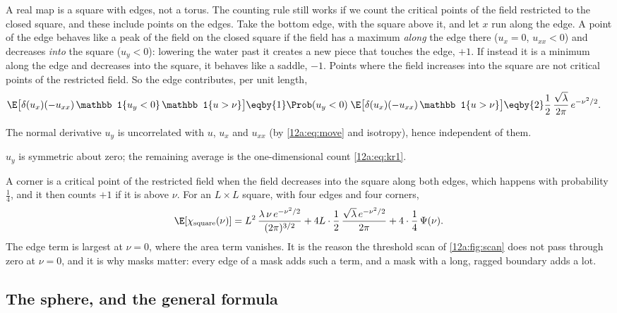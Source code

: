 A real map is a square with edges, not a torus. The counting rule still works if we count the critical
points of the field restricted to the closed square, and these include points on the edges. Take the bottom
edge, with the square above it, and let $x$ run along the edge. A point of the edge behaves like a peak of the
field on the closed square if the field has a maximum \emph{along} the edge there ($u_x=0$, $u_{xx}<0$) and
decreases \emph{into} the square ($u_y<0$): lowering the water past it creates a new piece that touches the
edge, $+1$. If instead it is a minimum along the edge and decreases into the square, it behaves like a saddle,
$-1$. Points where the field increases into the square are not critical points of the restricted field. So
the edge contributes, per unit length,
\begin{align}
  \E\big[\delta(u_x)(-u_{xx})\,\mathbb 1\{u_y<0\}\,\mathbb 1\{u>\nu\}\big]
  &\eqby{1}\Prob(u_y<0)\;\E\big[\delta(u_x)(-u_{xx})\,\mathbb 1\{u>\nu\}\big]
   \eqby{2}\frac12\,\frac{\sqrt\lambda}{2\pi}\,e^{-\nu^2/2}.
  \label{12a:eq:edge}
\end{align}
\begin{explain}
  \item The normal derivative $u_y$ is uncorrelated with $u$, $u_x$ and $u_{xx}$ (by \eqref{12a:eq:move} and
        isotropy), hence independent of them.
  \item $u_y$ is symmetric about zero; the remaining average is the one-dimensional count \eqref{12a:eq:kr1}.
\end{explain}
A corner is a critical point of the restricted field when the field decreases into the square along both
edges, which happens with probability $\frac14$, and it then counts $+1$ if it is above $\nu$. For an
$L\times L$ square, with four edges and four corners,
\begin{equation}
  \E[\chi_{\rm square}(\nu)]=L^2\,\frac{\lambda\,\nu\,e^{-\nu^2/2}}{(2\pi)^{3/2}}
   +4L\cdot\frac12\,\frac{\sqrt\lambda\,e^{-\nu^2/2}}{2\pi}+4\cdot\frac14\,\Psi(\nu) .
  \label{12a:eq:square}
\end{equation}
The edge term is largest at $\nu=0$, where the area term vanishes. It is the reason the threshold scan of
\cref{12a:fig:scan} does not pass through zero at $\nu=0$, and it is why masks matter: every edge of a mask
adds such a term, and a mask with a long, ragged boundary adds a lot.

\subsection{The sphere, and the general formula}
\label{12a:sec:sphere}

